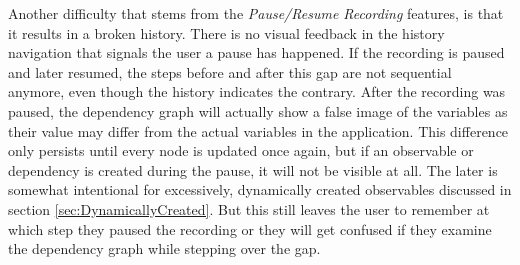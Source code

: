 Another difficulty that stems from the \emph{Pause/Resume Recording} features, is that it results in a broken history. There is no visual feedback in the history navigation that signals the user a pause has happened. If the recording is paused and later resumed, the steps before and after this gap are not sequential anymore, even though the history indicates the contrary. After the recording was paused, the dependency graph will actually show a false image of the variables as their value may differ from the actual variables in the application. This difference only persists until every node is updated once again, but if an observable or dependency is created during the pause, it will not be visible at all. The later is somewhat intentional for excessively, dynamically created observables discussed in section \ref{sec:DynamicallyCreated}. But this still leaves the user to remember at which step they paused the recording or they will get confused if they examine the dependency graph while stepping over the gap.
	
